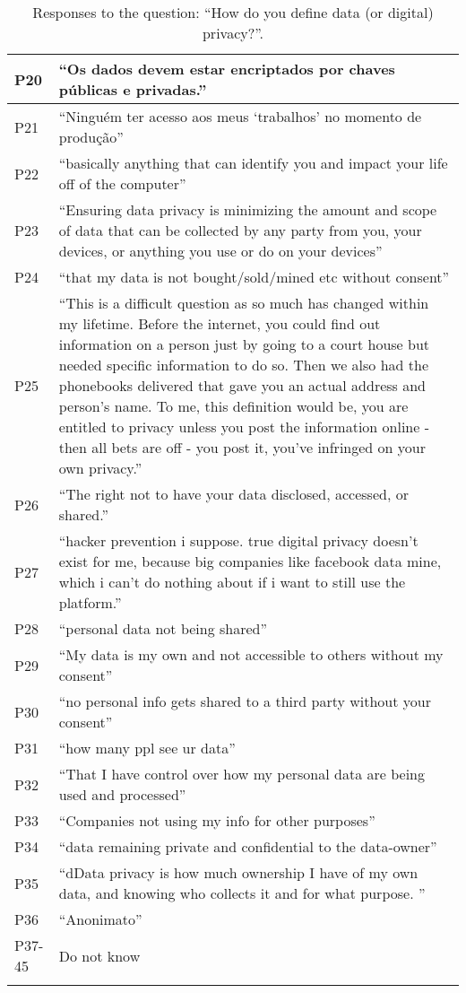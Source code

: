 \begin{longtable}{p{3cm} p{13cm}}
    \hline
    P20 & ``Os dados devem estar encriptados por chaves públicas e privadas.'' \\
    \hline
    P21 & ``Ninguém ter acesso aos meus `trabalhos' no momento de produção'' \\
    \hline
    P22 & ``basically anything that can identify you and impact your life off of the computer'' \\
    \hline
    P23 & ``Ensuring data privacy is minimizing the amount and scope of data that can be collected by any party from you, your devices, or anything you use or do on your devices'' \\
    \hline
    P24 & ``that my data is not bought/sold/mined etc without consent'' \\
    \hline
    P25 & ``This is a difficult question as so much has changed within my lifetime. Before the internet, you could find out information on a person just by going to a court house but needed specific information to do so. Then we also had the phonebooks delivered that gave you an actual address and person's name. To me, this definition would be, you are entitled to privacy unless you post the information online - then all bets are off - you post it, you've infringed on your own privacy.'' \\
    \hline
    P26 & ``The right not to have your data disclosed, accessed, or shared.'' \\
    \hline
    P27 & ``hacker prevention i suppose. true digital privacy doesn't exist for me, because big companies like facebook data mine, which i can't do nothing about if i want to still use the platform.'' \\
    \hline
    P28 & ``personal data not being shared'' \\
    \hline
    P29 & ``My data is my own and not accessible to others without my consent'' \\
    \hline
    P30 & ``no personal info gets shared to a third party without your consent'' \\
    \hline
    P31 & ``how many ppl see ur data'' \\
    \hline
    P32 & ``That I have control over how my personal data are being used and processed'' \\
    \hline
    P33 & ``Companies not using my info for other purposes'' \\
    \hline
    P34 & ``data remaining private and confidential to the data-owner'' \\
    \hline
    P35 & ``dData privacy is how much ownership I have of my own data, and knowing who collects it and for what purpose. '' \\
    \hline
    P36 & ``Anonimato'' \\
    \hline
    P37-45 & Do not know \\
    \hline
    \caption*{Responses to the question: ``How do you define data (or digital) privacy?''.}
    \label{table:survey_s1_q5}
\end{longtable}

